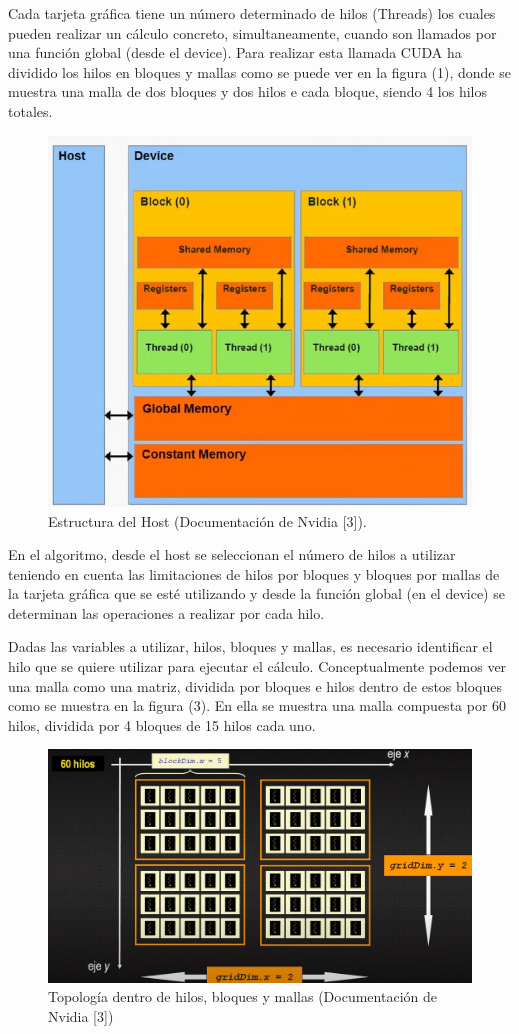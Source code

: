 \documentclass[11pt,a4paper,twoside,pdf]{article}
\numberwithin{equation}{section}
\begin{document}
Cada tarjeta gráfica tiene un número determinado de hilos (Threads) los cuales pueden realizar un cálculo concreto, simultaneamente, cuando son llamados por una función global (desde el device). Para realizar esta llamada CUDA ha dividido los hilos en bloques y mallas como se puede ver en la figura (1), donde se muestra una malla de dos bloques y dos hilos e cada bloque, siendo 4 los hilos totales.

\begin{figure}[h]
\centering
\includegraphics[width=10 cm]{Nvidia-Device_Structure.jpg}				
\caption{Estructura del Host (Documentación de Nvidia [3]). }
\end{figure}
\noindent

En el algoritmo, desde el host se seleccionan el número de hilos a utilizar teniendo en cuenta las limitaciones de hilos por bloques y bloques por mallas de la tarjeta gráfica que se esté utilizando y desde la función global (en el device) se determinan las operaciones a realizar por cada hilo. 

Dadas las variables a utilizar, hilos, bloques y mallas, es necesario identificar el hilo que se quiere utilizar para ejecutar el cálculo. Conceptualmente podemos ver una malla como una matriz, dividida por bloques e hilos dentro de estos bloques como se muestra en la figura (3). En ella se muestra una malla compuesta por 60 hilos, dividida por 4 bloques de 15 hilos cada uno.

\begin{figure}[h]
\centering
\includegraphics[width=10 cm]{Nvidia_Topologia_virtual.jpg}				
\caption{Topología dentro de hilos, bloques y mallas (Documentación de Nvidia [3]) }
\end{figure}
\noindent
\end{document}
